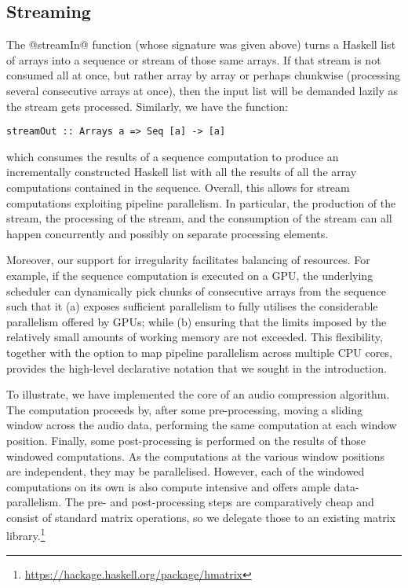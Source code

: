 \subsection{Streaming}
\label{sec:streaming}

The @streamIn@ function (whose signature was given above) turns a Haskell list of arrays into a sequence or stream of those same arrays. If that stream is not consumed all at once, but rather array by array or perhaps chunkwise (processing several consecutive arrays at once), then the input list will be demanded lazily as the stream gets processed. Similarly, we have the function:
%
\begin{lstlisting}
streamOut :: Arrays a => Seq [a] -> [a]
\end{lstlisting}
%
which consumes the results of a sequence computation to produce an incrementally constructed Haskell list with all the results of all the array computations contained in the sequence. Overall, this allows for stream computations exploiting pipeline parallelism. In particular, the production of the stream, the processing of the stream, and the consumption of the stream can all happen concurrently and possibly on separate processing elements.

Moreover, our support for irregularity facilitates balancing of resources. For example, if the sequence computation is executed on a GPU, the underlying scheduler can dynamically pick chunks of consecutive arrays from the sequence such that it (a) exposes sufficient parallelism to fully utilises the considerable parallelism offered by GPUs; while (b) ensuring that the limits imposed by the relatively small amounts of working memory are not exceeded. This flexibility, together with the option to map pipeline parallelism across multiple CPU cores, provides the high-level declarative notation that we sought in the introduction.

To illustrate, we have implemented the core of an audio compression algorithm. The computation proceeds by, after some pre-processing, moving a sliding window across the audio data, performing the same computation at each window position. Finally, some post-processing is performed on the results of those windowed computations. As the computations at the various window positions are independent, they may be parallelised. However, each of the windowed computations on its own is also compute intensive and offers ample data-parallelism. The pre- and post-processing steps are comparatively cheap and consist of standard matrix operations, so we delegate those to an existing matrix library.\footnote{\url{https://hackage.haskell.org/package/hmatrix}}

